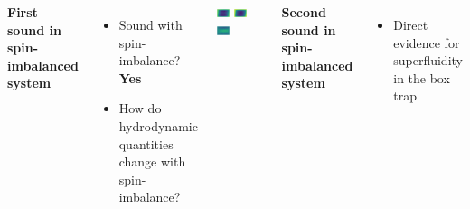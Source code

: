 \documentclass[26pt, paperwidth=36in,paperheight=48in]{tikzposter} %
\newcommand{\myfont}{\fontsize{26}{36}\selectfont}
\begin{document}
\begin{columns}
		
	\block[roundedcorners=0]{\textcolor{BEC1blue}{Outlook}}
	{
		\vspace{2.0cm}
		\begin{minipage}{0.4\textwidth}
			\flushleft
			\textbf{First sound in spin-imbalanced system}
			\vspace{0.5cm}
			\myfont
			\begin{itemize}
				\item Sound with spin-imbalance? \textbf{Yes}
				\item How do hydrodynamic quantities change with spin-imbalance?
			\end{itemize}
		\end{minipage}
		
	\vspace{2.0cm}
	\begin{minipage}{0.4\textwidth}
		\hspace{1.0cm}
		\vspace{1.0cm}
		\includegraphics[width=0.28\textwidth]{figures_retreat/Sound_Image.pdf}
		\hspace{1.0cm}
		\includegraphics[width=0.28\textwidth]{figures_retreat/No_Sound_Image.pdf}
		\hspace{1.0cm}
		\includegraphics[width=0.28\textwidth]{figures_retreat/Sound_Subtracted_Image.pdf}
	\end{minipage}	
	
	\vspace{1.0cm}
	\begin{minipage}{0.3\textwidth}
		\flushleft
		\textbf{Second sound in spin-imbalanced system}
		\vspace{0.5cm}
		\myfont
		\begin{itemize}
			\item Direct evidence for superfluidity in the box trap
			

\end{itemize}
\end{minipage}}
\end{columns}
\end{document}
